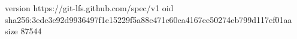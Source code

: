 version https://git-lfs.github.com/spec/v1
oid sha256:3edc3e92d9936497f1e15229f5a88c471c60ca4167ee50274eb799d117ef01aa
size 87544

